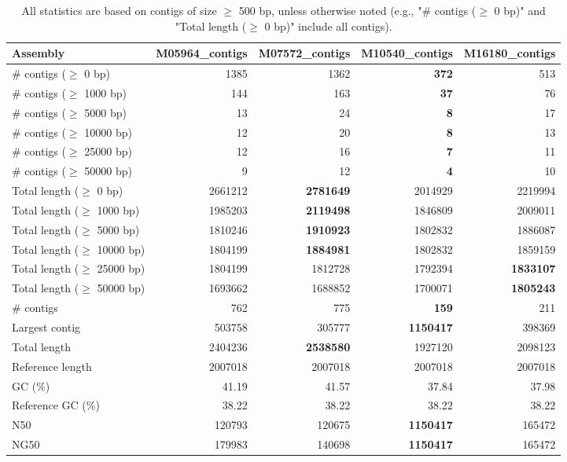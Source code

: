 \documentclass[12pt,a4paper]{article}
\begin{document}
\begin{table}[ht]
\begin{center}
\caption{All statistics are based on contigs of size $\geq$ 500 bp, unless otherwise noted (e.g., "\# contigs ($\geq$ 0 bp)" and "Total length ($\geq$ 0 bp)" include all contigs).}
\begin{tabular}{|l*{4}{|r}|}
\hline
Assembly & M05964\_contigs & M07572\_contigs & M10540\_contigs & M16180\_contigs \\ \hline
\# contigs ($\geq$ 0 bp) & 1385 & 1362 & {\bf 372} & 513 \\ \hline
\# contigs ($\geq$ 1000 bp) & 144 & 163 & {\bf 37} & 76 \\ \hline
\# contigs ($\geq$ 5000 bp) & 13 & 24 & {\bf 8} & 17 \\ \hline
\# contigs ($\geq$ 10000 bp) & 12 & 20 & {\bf 8} & 13 \\ \hline
\# contigs ($\geq$ 25000 bp) & 12 & 16 & {\bf 7} & 11 \\ \hline
\# contigs ($\geq$ 50000 bp) & 9 & 12 & {\bf 4} & 10 \\ \hline
Total length ($\geq$ 0 bp) & 2661212 & {\bf 2781649} & 2014929 & 2219994 \\ \hline
Total length ($\geq$ 1000 bp) & 1985203 & {\bf 2119498} & 1846809 & 2009011 \\ \hline
Total length ($\geq$ 5000 bp) & 1810246 & {\bf 1910923} & 1802832 & 1886087 \\ \hline
Total length ($\geq$ 10000 bp) & 1804199 & {\bf 1884981} & 1802832 & 1859159 \\ \hline
Total length ($\geq$ 25000 bp) & 1804199 & 1812728 & 1792394 & {\bf 1833107} \\ \hline
Total length ($\geq$ 50000 bp) & 1693662 & 1688852 & 1700071 & {\bf 1805243} \\ \hline
\# contigs & 762 & 775 & {\bf 159} & 211 \\ \hline
Largest contig & 503758 & 305777 & {\bf 1150417} & 398369 \\ \hline
Total length & 2404236 & {\bf 2538580} & 1927120 & 2098123 \\ \hline
Reference length & 2007018 & 2007018 & 2007018 & 2007018 \\ \hline
GC (\%) & 41.19 & 41.57 & 37.84 & 37.98 \\ \hline
Reference GC (\%) & 38.22 & 38.22 & 38.22 & 38.22 \\ \hline
N50 & 120793 & 120675 & {\bf 1150417} & 165472 \\ \hline
NG50 & 179983 & 140698 & {\bf 1150417} & 165472 \\ \hline

\end{tabular}
\end{center}
\end{table}
\end{document}
